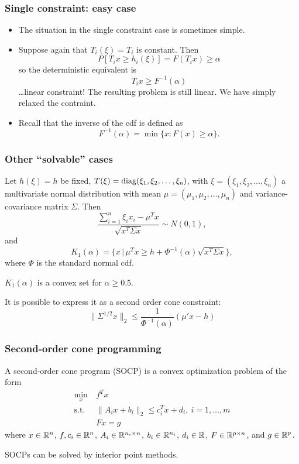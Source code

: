 \documentclass{beamer}
\begin{document}
\begin{frame}
\frametitle{Single constraint: easy case}

\begin{itemize}
	\item 
The situation in the single constraint case is sometimes simple.
\item 
Suppose again that $T_i (\xi) = T_i$ is constant. Then
\[
P[T_i x \geq h_i (\xi)] = F(T_i x) \geq \alpha
\]
so the deterministic equivalent is
\[
T_i x \geq F^{-1}(\alpha)
\]
\ldots linear constraint! The resulting problem is still linear. We have simply relaxed the contraint.
\item 
Recall that the inverse of the cdf is defined as
\[
F^{-1}(\alpha) = \min \lbrace x : F (x)  \geq \alpha \rbrace.
\]
\end{itemize}

\end{frame}

\begin{frame}
\frametitle{Other ``solvable'' cases}

Let $h(\xi) = h$ be fixed, $T(\xi) = \rm{diag}(\xi_1, \xi_2,\ldots, \xi_n)$, with $\xi = (\xi_1, \xi_2,\ldots, \xi_n)$ a multivariate normal distribution with mean $\mu = (\mu_1, \mu_2,\ldots,\mu_n)$ and variance-covariance matrix $\Sigma$.
Then
$$
\frac{\sum_{i = 1}^n \xi_i x_i - \mu^T x}{\sqrt{x^T\Sigma x}} \sim N(0,1),
$$
and
\[
K_1(\alpha) = \lbrace x \,|\, \mu^T x \geq h + \Phi^{-1}(\alpha) \sqrt{x^T\Sigma x} \rbrace,
\]
where $\Phi$ is the standard normal cdf.

\mbox{}

$K_1(\alpha)$ is a convex set for $\alpha \geq 0.5$.

\mbox{}

It is possible to express it as a second order cone constraint:
$$
\| \Sigma^{1/2} x \|_2 \leq \frac{1}{\Phi^{-1}(\alpha)} (\mu' x - h)
$$

\end{frame}

\begin{frame}
\frametitle{Second-order cone programming}

A second-order cone program (SOCP) is a convex optimization problem of the form
\begin{align*}
\min_x \ & f^T x \\
\mbox{s.t. } &
\| A_i x + b_i \|_2 \leq c_i^T x + d_i,\ i = 1,\ldots,m \\
& F x = g
\end{align*}
where $x \in {\mathbb{R}}^n$, $f, c_i \in {\mathbb{R}}^n$, $A_i \in {\mathbb{R}}^{n_i \times n}$, $b_i \in {\mathbb{R}}^{n_i}$, $d_i \in {\mathbb{R}}$, $F \in {\mathbb{R}}^{p \times n}$, and $g \in {\mathbb{R}}^p$.

\mbox{}

SOCPs can be solved by interior point methods.

\end{frame}
\end{document}
